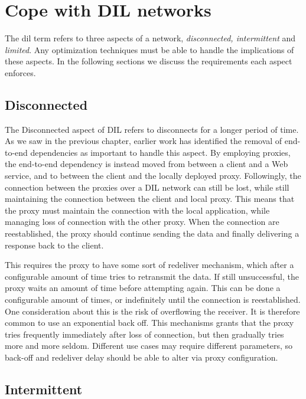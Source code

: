 \section{Cope with DIL networks}

The \gls{dil} term refers to three aspects of a network, \textit{disconnected,
intermittent} and \textit{limited}. Any optimization techniques must be able to
handle the implications of these aspects. In the following sections we discuss
the requirements each aspect enforces.

\subsection{Disconnected}

The Disconnected aspect of DIL refers to disconnects for a longer period of
time. As we saw in the previous chapter, earlier work has identified the removal
of end-to-end dependencies as important to handle this aspect. By employing
proxies, the end-to-end dependency is instead moved from between a client and a
Web service, and to between the client and the locally deployed proxy.
Followingly, the connection between the proxies over a DIL network can still be
lost, while still maintaining the connection between the client and local proxy.
This means that the proxy must maintain the connection with the local
application, while managing loss of connection with the other proxy. When the
connection are reestablished, the proxy should continue sending the data and
finally delivering a response back to the client.

This requires the proxy to have some sort of redeliver mechanism, which after a
configurable amount of time tries to retransmit the data. If still unsuccessful,
the proxy waits an amount of time before attempting again. This can be done a
configurable amount of times, or indefinitely until the connection is
reestablished. One consideration about this is the risk of overflowing the
receiver. It is therefore common to use an exponential back off. This mechanisms
grants that the proxy tries frequently immediately after loss of connection, but
then gradually tries more and more seldom. Different use cases may require
different parameters, so back-off and redeliver delay should be able to alter
via proxy configuration.

\subsection{Intermittent}

